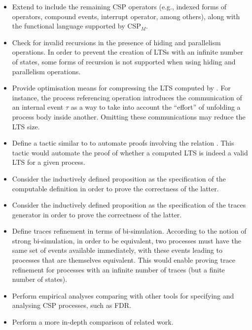 \begin{itemize}
	\item Extend \CSPcoq{} to include the remaining CSP operators (e.g., indexed forms of operators, compound events, interrupt operator, among others), along with the functional language supported by CSP$_{M}$.
	
	\item Check for invalid recursions in the presence of hiding and parallelism operations. In order to prevent the creation of LTSs with an infinite number of states, some forms of recursion is not supported when using hiding and parallelism operations.
	
	\item Provide optimisation means for compressing the LTS computed by . For instance, the process referencing operation introduces the communication of an internal event $ \tau $ as a way to take into account the ``effort'' of unfolding a process body inside another. Omitting these communications may reduce the LTS size.
	
	\item Define a tactic similar to  to automate proofs involving the relation . This tactic would automate the proof of whether a computed LTS is indeed a valid LTS for a given process.
	
	\item Consider the inductively defined proposition  as the specification of the computable definition  in order to prove the correctness of the latter.
	
	\item Consider the inductively defined proposition  as the specification of the traces generator  in order to prove the correctness of the latter.
	
	\item Define traces refinement in terms of bi-simulation. According to the notion of strong bi-simulation, in order to be equivalent, two processes must have the same set of events available immediately, with these events leading to processes that are themselves equivalent. This would enable proving trace refinement for processes with an infinite number of traces (but a finite number of states).
	
	\item Perform empirical analyses comparing \CSPcoq{} with other tools for specifying and analysing CSP processes, such as FDR.

	\item Perform a more in-depth comparison of related work.
	
\end{itemize}